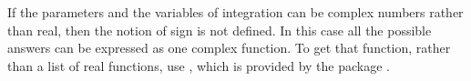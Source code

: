 {{{{{{{{{{{{{\begin{xtc}
\begin{TeXOutput}
\begin{fricasmath}{5}
%
\end{fricasmath}
\end{TeXOutput}
\end{xtc}

If the parameters and the variables of integration can be complex
numbers rather than real, then the notion of sign is not defined.
In this case all the possible answers can be expressed as one
complex function.
To get that function, rather than a list of real functions, use
,
which is provided by the package
.

}}}}}}}}}}}}}
